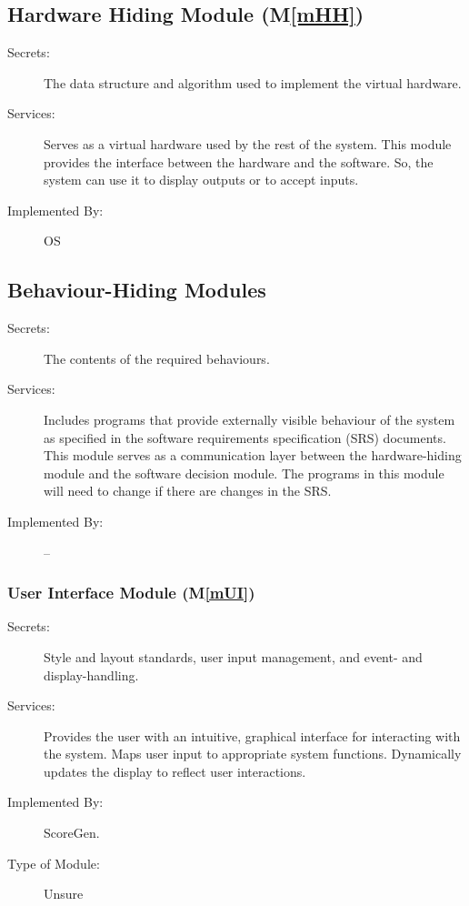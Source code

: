 \documentclass[12pt, titlepage]{article}
\newcommand{\mref}[1]{M\ref{#1}}
\begin{document}
\subsection{Hardware Hiding Module (\mref{mHH})}

\begin{description}
\item[Secrets:]The data structure and algorithm used to implement the virtual
  hardware.
\item[Services:]Serves as a virtual hardware used by the rest of the
  system. This module provides the interface between the hardware and the
  software. So, the system can use it to display outputs or to accept inputs.
\item[Implemented By:] OS
\end{description}

\subsection{Behaviour-Hiding Modules}

\begin{description}
\item[Secrets:] The contents of the required behaviours.
\item[Services:] Includes programs that provide externally visible behaviour of
  the system as specified in the software requirements specification (SRS)
  documents. This module serves as a communication layer between the
  hardware-hiding module and the software decision module. The programs in this
  module will need to change if there are changes in the SRS.
\item[Implemented By:] --
\end{description}

\subsubsection{User Interface Module (\mref{mUI})}

\begin{description}
\item[Secrets:] Style and layout standards, user input management, and event- and display-handling.
\item[Services:] Provides the user with an intuitive, graphical interface for interacting with the system.
  Maps user input to appropriate system functions. Dynamically updates the display to reflect user interactions.
\item[Implemented By:] ScoreGen.
\item[Type of Module:] Unsure
\end{description}
\end{document}
